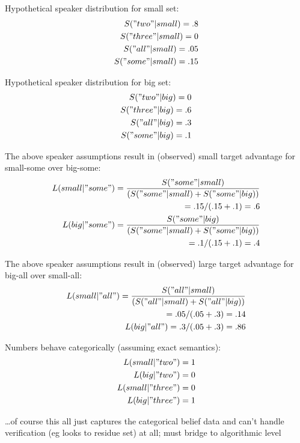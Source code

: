 \documentclass[10pt,letterpaper]{article}
\begin{document}
Hypothetical speaker distribution for small set:
\begin{eqnarray*}
S("two"|small) = .8\\
S("three"|small) = 0\\
S("all"|small) = .05\\
S("some"|small) = .15\\
\end{eqnarray*}

Hypothetical speaker distribution for big set:
\begin{eqnarray*}
S("two"|big) = 0\\
S("three"|big) = .6\\
S("all"|big) = .3\\
S("some"|big) = .1\\
\end{eqnarray*}

The above speaker assumptions result in (observed) small target advantage for small-some over big-some:
\begin{eqnarray*}
L(small|"some") =  \frac{S("some"|small)}{(S("some"|small) + S("some"|big))} \\
= .15 / (.15+.1) = .6\\
L(big|"some") = \frac{S("some"|big)}{(S("some"|small) + S("some"|big))} \\
= .1 / (.15+.1) = .4
\end{eqnarray*}

The above speaker assumptions result in (observed) large target advantage for big-all over small-all:
\begin{eqnarray*}
L(small|"all") = \frac{S("all"|small)}{(S("all"|small) + S("all"|big))}\\ 
= .05 / (.05+.3) = .14\\
L(big|"all") = .3 / (.05+.3) = .86
\end{eqnarray*}

Numbers behave categorically (assuming exact semantics):
\begin{eqnarray*}
L(small|"two") = 1\\
L(big|"two") = 0\\
L(small|"three") = 0\\
L(big|"three") = 1
\end{eqnarray*}

\dots of course this all just captures the categorical belief data and can't handle verification (eg looks to residue set) at all; must bridge to algorithmic level
\end{document}
